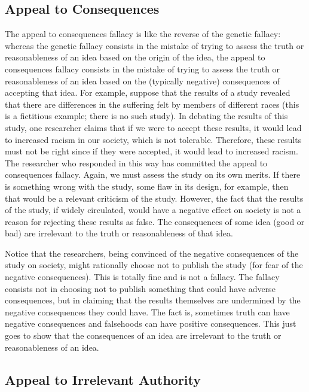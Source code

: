 \subsection{Appeal to Consequences}
The appeal to consequences fallacy is like the reverse of the genetic fallacy: whereas the genetic fallacy consists in the mistake of trying to assess the truth or reasonableness of an idea based on the origin of the idea, the appeal to consequences fallacy consists in the mistake of trying to assess the truth or reasonableness of an idea based on the (typically negative) consequences of accepting that idea. For example, suppose that the results of a study revealed that there are differences in the suffering felt by members of different races (this is a fictitious example; there is no such study). In debating the results of this study, one researcher claims that if we were to accept these results, it would lead to increased racism in our society, which is not tolerable. Therefore, these results must not be right since if they were accepted, it would lead to increased racism. The researcher who responded in this way has committed the appeal to consequences fallacy. Again, we must assess the study on its own merits. If there is something wrong with the study, some flaw in its design, for example, then that would be a relevant criticism of the study. However, the fact that the results of the study, if widely circulated, would have a negative effect on society is not a reason for rejecting these results as false. The consequences of some idea (good or bad) are irrelevant to the truth or reasonableness of that idea.

Notice that the researchers, being convinced of the negative consequences of the study on society, might rationally choose not to publish the study (for fear of the negative consequences). This is totally fine and is not a fallacy. The fallacy consists not in choosing not to publish something that could have adverse consequences, but in claiming that the results themselves are undermined by the negative consequences they could have. The fact is, sometimes truth can have negative consequences and falsehoods can have positive consequences. This just goes to show that the consequences of an idea are irrelevant to the truth or reasonableness of an idea.

\subsection{Appeal to Irrelevant Authority}

